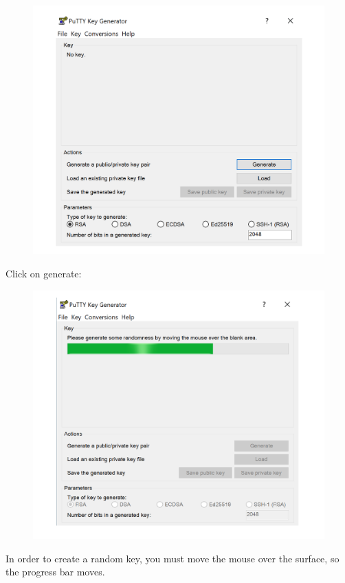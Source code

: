 \begin{figure}
  \includegraphics[width=13cm]{Images/example8.png}
  \centering
\end{figure}

\newpage

Click on generate:

\begin{figure}
  \includegraphics[width=13cm]{Images/example9.png}
  \centering
\end{figure}

In order to create a random key, you must move the mouse over the surface, so the progress bar moves.
\newpage

